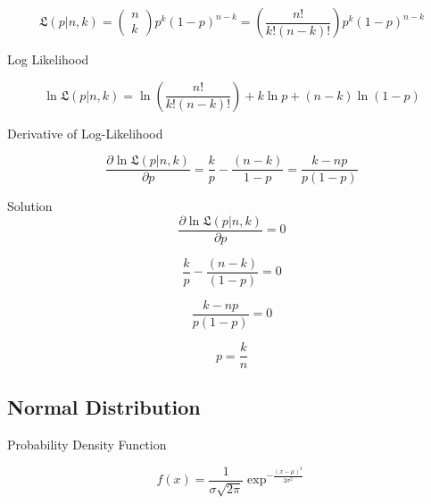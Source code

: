 \documentclass[12pt]{report}
\begin{document}
\begin{equation}
\mathfrak{L}(p|n,k) = \begin{pmatrix}
n\\k
\end{pmatrix} p^k (1-p)^{n-k} =\left( \frac{n!}{k!(n-k)!}\right) p^k (1-p)^{n-k}
\end{equation}

Log Likelihood

\begin{equation}
\ln \mathfrak{L}(p | n, k) = \ln \left( \frac{n!}{k!(n-k)!}\right) + k \ln p  + (n-k) \ln (1-p)
\end{equation}


Derivative of Log-Likelihood

\begin{equation}
\frac{\partial \ln \mathfrak{L}(p | n, k)}{\partial p} = \frac{k}{p} - \frac{(n-k)}{1 - p} = \frac{k - np}{p (1-p)}
\end{equation}


Solution 
\begin{equation}
\frac{\partial \ln \mathfrak{L}(p | n, k)}{\partial p} = 0
\end{equation}

\begin{equation}
\frac{k}{p} - \frac{(n-k)}{(1-p)} = 0
\end{equation}

\begin{equation}
\frac{k - np}{p (1-p)} = 0
\end{equation}

\begin{equation}
p = \frac{k}{n}
\end{equation}


\clearpage
\subsection*{Normal Distribution}


Probability Density Function

\begin{equation}
f(x) = \frac{1}{\sigma \sqrt{2 \pi}} \exp^{-\frac{(x-\mu)^2}{2\sigma^2}}
\end{equation}
\end{document}
